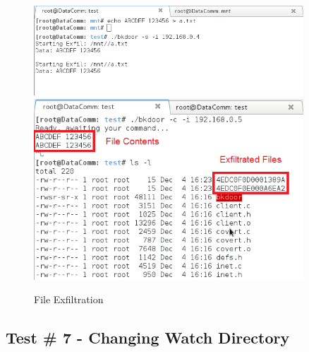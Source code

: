 \documentclass[titlepage]{article}
\begin{document}
\begin{figure}[htb]                                                                       
  \begin{center}
    \includegraphics[width=0.9\textwidth]{Pictures/Exfiltration.png}
    \includegraphics[width=0.9\textwidth]{Pictures/CExfiltration.png}
  \end{center}
  \caption{File Exfiltration}
  \label{fig:exfiltration}
\end{figure}

\clearpage

\subsection{Test \# 7 - Changing Watch Directory}
\end{document}
